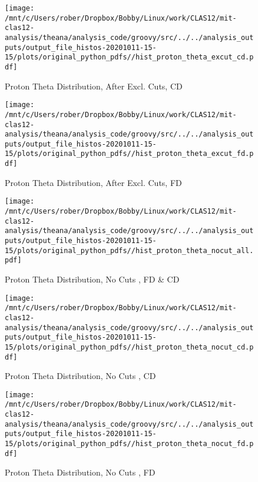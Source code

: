 \documentclass{article}
\begin{document}
\begin{landscape}
    \begin{figure}[h]
        \centering

        \texttt{[image: /mnt/c/Users/rober/Dropbox/Bobby/Linux/work/CLAS12/mit-clas12-analysis/theana/analysis\_code/groovy/src/../../analysis\_outputs/output\_file\_histos-20201011-15-15/plots/original\_python\_pdfs//hist\_proton\_theta\_excut\_cd.pdf]}
        \captionsetup{textformat=empty,labelformat=blank}
        \caption{Proton Theta Distribution, After Excl. Cuts, CD}
    \end{figure}
    \clearpage
    
    \begin{figure}[h]
        \centering

        \texttt{[image: /mnt/c/Users/rober/Dropbox/Bobby/Linux/work/CLAS12/mit-clas12-analysis/theana/analysis\_code/groovy/src/../../analysis\_outputs/output\_file\_histos-20201011-15-15/plots/original\_python\_pdfs//hist\_proton\_theta\_excut\_fd.pdf]}
        \captionsetup{textformat=empty,labelformat=blank}
        \caption{Proton Theta Distribution, After Excl. Cuts, FD}
    \end{figure}
    \clearpage
    
    \begin{figure}[h]
        \centering

        \texttt{[image: /mnt/c/Users/rober/Dropbox/Bobby/Linux/work/CLAS12/mit-clas12-analysis/theana/analysis\_code/groovy/src/../../analysis\_outputs/output\_file\_histos-20201011-15-15/plots/original\_python\_pdfs//hist\_proton\_theta\_nocut\_all.pdf]}
        \captionsetup{textformat=empty,labelformat=blank}
        \caption{Proton Theta Distribution, No Cuts , FD \& CD}
    \end{figure}
    \clearpage
    
    \begin{figure}[h]
        \centering

        \texttt{[image: /mnt/c/Users/rober/Dropbox/Bobby/Linux/work/CLAS12/mit-clas12-analysis/theana/analysis\_code/groovy/src/../../analysis\_outputs/output\_file\_histos-20201011-15-15/plots/original\_python\_pdfs//hist\_proton\_theta\_nocut\_cd.pdf]}
        \captionsetup{textformat=empty,labelformat=blank}
        \caption{Proton Theta Distribution, No Cuts , CD}
    \end{figure}
    \clearpage
    
    \begin{figure}[h]
        \centering

        \texttt{[image: /mnt/c/Users/rober/Dropbox/Bobby/Linux/work/CLAS12/mit-clas12-analysis/theana/analysis\_code/groovy/src/../../analysis\_outputs/output\_file\_histos-20201011-15-15/plots/original\_python\_pdfs//hist\_proton\_theta\_nocut\_fd.pdf]}
        \captionsetup{textformat=empty,labelformat=blank}
        \caption{Proton Theta Distribution, No Cuts , FD}
    \end{figure}
    \clearpage
    

\end{landscape}
\end{document}
